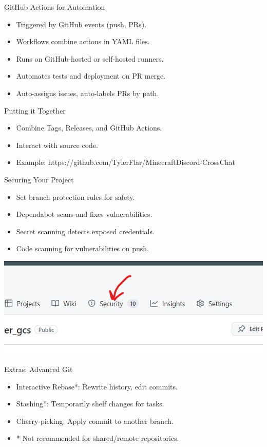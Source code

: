\documentclass[aspectratio=169]{beamer}
\begin{document}
\begin{frame}{GitHub Actions for Automation}
    \begin{itemize}
        \item Triggered by GitHub events (push, PRs).
        \item Workflows combine actions in YAML files.
        \item Runs on GitHub-hosted or self-hosted runners.
        \item Automates tests and deployment on PR merge.
        \item Auto-assigns issues, auto-labels PRs by path.
    \end{itemize}
\end{frame}
\begin{frame}{Putting it Together}
    \begin{itemize}
        \item Combine Tags, Releases, and GitHub Actions.
        \item Interact with source code.
        \item Example: https://github.com/TylerFlar/MinecraftDiscord-CrossChat
    \end{itemize}
\end{frame}
\begin{frame}{Securing Your Project}
    \begin{itemize}
        \item Set branch protection rules for safety.
        \item Dependabot scans and fixes vulnerabilities.
        \item Secret scanning detects exposed credentials.
        \item Code scanning for vulnerabilities on push.
    \end{itemize}
    \begin{center}
        \includegraphics[scale=.5]{github_security.jpg}
    \end{center}
\end{frame}
\begin{frame}{Extras: Advanced Git}
    \begin{itemize}
        \item Interactive Rebase*: Rewrite history, edit commits.
        \item Stashing*: Temporarily shelf changes for tasks.
        \item Cherry-picking: Apply commit to another branch.
        \item * Not recommended for shared/remote repositories.
    \end{itemize}
\end{frame}
\end{document}
